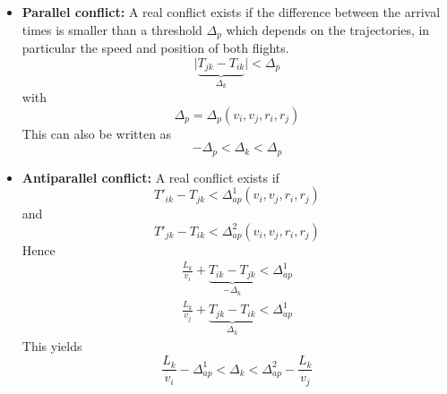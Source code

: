 \documentclass{article}
\begin{document}
\begin{itemize}
    \item {\bf Parallel conflict:}
        A real conflict exists if the difference between the arrival times is smaller than a threshold $\Delta_p$ which depends on the trajectories, in particular the speed and position of both flights.
        \begin{equation*}
            \bigl| \underbrace{T_{jk} - T_{ik}}_{\Delta_k} \bigr| < \Delta_p
        \end{equation*}
        with
        \begin{equation*}
            \Delta_p = \Delta_p(v_i, v_j, r_i, r_j)
        \end{equation*}
        This can also be written as
        \begin{equation}  \label{eqn:conflict_parallel}
            -\Delta_p < \Delta_k < \Delta_p 
        \end{equation}
        
    \item {\bf Antiparallel conflict:}
        A real conflict exists if 
        \begin{equation*}
            T'_{ik} - T_{jk} < \Delta^1_{ap}(v_i, v_j, r_i, r_j)
        \end{equation*}
        and
        \begin{equation*}
            T'_{jk} - T_{ik} < \Delta^2_{ap}(v_i, v_j, r_i, r_j)
        \end{equation*}
        Hence
        \begin{eqnarray*}
            \frac{L_k}{v_i} + \underbrace{T_{ik} - T_{jk}}_{-\Delta_k} < \Delta^1_{ap} \\
            \frac{L_k}{v_j} + \underbrace{T_{jk} - T_{ik}}_{\Delta_k} < \Delta^1_{ap} 
        \end{eqnarray*}
        This yields
        \begin{equation} \label{eqn:conflict_antiparallel}
            \frac{L_k}{v_i} - \Delta^1_{ap} < \Delta_k < \Delta^2_{ap} - \frac{L_k}{v_j}
        \end{equation}
\end{itemize}
\end{document}
